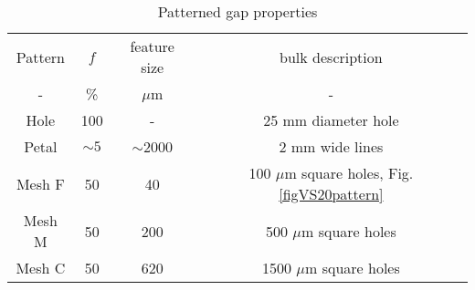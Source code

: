 \begin{table}[h!]
\caption{Patterned gap properties \label{tabPatternFills}}
\begin{center}
    \begin{tabular}{ c c c c }
    \hline
    Pattern & $f$ & feature size & bulk description \\ 
    - & \% & $\mu$m & - \\ 
    \hline
    Hole   & 100     &  -         & 25 mm diameter hole \\     
    Petal  & $\sim5$ & $\sim$2000 & 2 mm wide lines \\         
    Mesh F & 50      &         40 & 100 $\mu$m square holes, Fig. \ref{figVS20pattern}\\ 
    Mesh M & 50      & 200        & 500 $\mu$m square holes\\ 
    Mesh C & 50      & 620        & 1500 $\mu$m square holes\\     
        \hline
    \end{tabular}
\end{center}
\end{table}